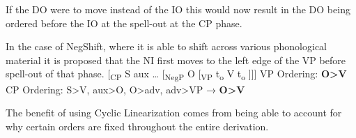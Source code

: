 \documentclass[12pt, letterpaper]{article}
\begin{document}
\ex If the DO were to move instead of the IO this would now result in the DO being ordered before the IO at the spell-out at the CP phase. 

\ex In the case of NegShift, where it is able to shift across various phonological material it is proposed that the NI first moves to the left edge of the VP before spell-out of that phase. 
\vspace{6pt}
	\ea {}[\textsubscript{CP} S aux … [\textsubscript{NegP} O [\textsubscript{VP} t\textsubscript{o}  V t\textsubscript{o} ]]]
	\ex VP Ordering: \textbf{O>V}\\
	CP Ordering: S>V, aux>O, O>adv, adv>VP → \textbf{O>V}
	\z

\ex The benefit of using Cyclic Linearization comes from being able to account for why certain orders are fixed throughout the entire derivation.
\z 
\end{document}
